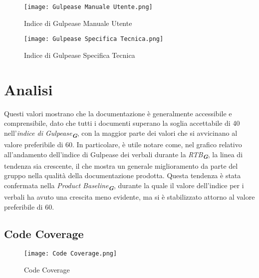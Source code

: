 \begin{figure}[H]
    \centering

    \begin{minipage}{.4\textwidth}
        \centering
        \texttt{[image: Gulpease Manuale Utente.png]}
        \caption{Indice di Gulpease Manuale Utente}
        \label{fig:Gulpease Manuale Utente}
    \end{minipage}%
    \hfill
    \begin{minipage}{.4\textwidth}
        \centering
        \texttt{[image: Gulpease Specifica Tecnica.png]}
        \caption{Indice di Gulpease Specifica Tecnica}
        \label{fig:Gulpease Specifica Tecnica}
    \end{minipage}

\end{figure}


\newpage

\section*{Analisi}

Questi valori mostrano che la documentazione è generalmente accessibile e comprensibile, 
dato che tutti i documenti superano la soglia accettabile di 40 nell'\emph{indice di Gulpease}\textsubscript{\textbf{\textit{G}}}, 
con la maggior parte dei valori che si avvicinano al valore preferibile di 60. 
In particolare, è utile notare come, nel grafico relativo all'andamento dell'indice di Gulpease dei verbali durante la \emph{RTB}\textsubscript{\textbf{\textit{G}}}, la linea di tendenza sia crescente,
il che mostra un generale miglioramento da parte del gruppo nella qualità della documentazione prodotta.
Questa tendenza è stata confermata nella \emph{Product Baseline}\textsubscript{\textbf{\textit{G}}},
durante la quale il valore dell'indice per i verbali ha avuto una crescita meno evidente, ma si è stabilizzato attorno al valore preferibile di 60.

\newpage

\subsection{Code Coverage}
\label{subsec:Code Coverage}

\begin{figure}[h] 
    \centering
    \texttt{[image: Code Coverage.png]}
    \caption{Code Coverage} 
    \label{fig: Code Coverage}
\end{figure}

